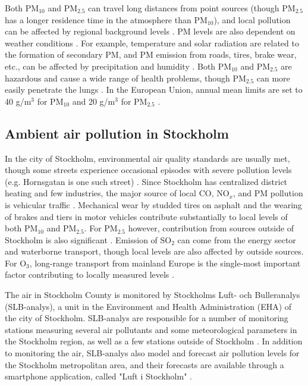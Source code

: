 Both PM$_{10}$ and PM$_{2.5}$ can travel long distances from point sources (though PM$_{2.5}$ has a longer residence time in the atmosphere than PM$_{10}$), and local pollution can be affected by regional background levels \cite{Schwarzenbach2016, slbanalys}. PM levels are also dependent on weather conditions \cite{Schwarzenbach2016}. For example, temperature and solar radiation are related to the formation of secondary PM, and PM emission from roads, tires, brake wear, etc., can be affected by precipitation and humidity \cite{slbanalys, atmos7020015}. Both PM$_{10}$ and PM$_{2.5}$ are hazardous and cause a wide range of health problems, though PM$_{2.5}$ can more easily penetrate the lungs \cite{Schwarzenbach2016}. In the European Union, annual mean limits are set to 40 \textmugreek g/m$^3$ for PM$_{10}$ and 20 \textmugreek g/m$^3$ for PM$_{2.5}$ \cite{eu-airquality}. 


\subsection{Ambient air pollution in Stockholm}
\label{air-pollution-stockholm}

In the city of Stockholm, environmental air quality standards are usually met, though some streets experience occasional episodes with severe pollution levels (e.g. Hornsgatan is one such street) \cite{slbanalys2021}. Since Stockholm has centralized district heating and few industries, the major source of local CO, NO$_x$, and PM pollution is vehicular traffic \cite{slbanalys, slbanalys2021}. Mechanical wear by studded tires on asphalt and the wearing of brakes and tiers in motor vehicles contribute substantially to local levels of both PM$_{10}$ and PM$_{2.5}$. For PM$_{2.5}$ however, contribution from sources outside of Stockholm is also significant \cite{slbanalys2021}. Emission of SO$_2$ can come from the energy sector and waterborne transport, though local levels are also affected by outside sources. 
For O$_3$, long-range transport from mainland Europe is the single-most important factor contributing to locally measured levels \cite{slbanalys2021}. 

The air in Stockholm County is monitored by Stockholms Luft- och Bulleranalys (SLB-analys), a unit in the Environment and Health Administration (EHA) of the city of Stockholm. SLB-analys are responsible for a number of monitoring stations measuring several air pollutants and some meteorological parameters in the Stockholm region, as well as a few stations outside of Stockholm \cite{slb-matningar}. In addition to monitoring the air, SLB-analys also model and forecast air pollution levels for the Stockholm metropolitan area, and their forecasts are available through a smartphone application, called "Luft i Stockholm" \cite{slbanalys}. 

